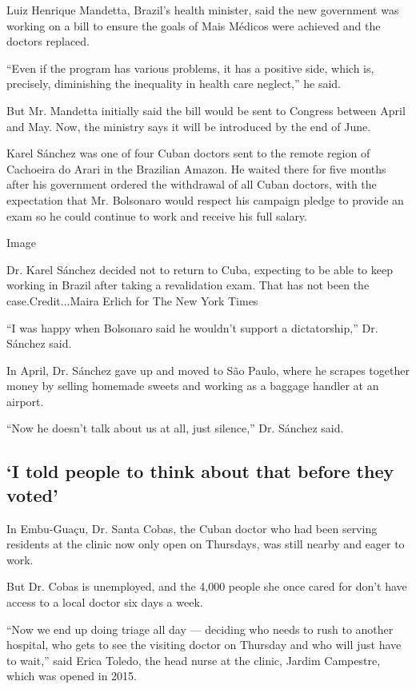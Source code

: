 Luiz Henrique Mandetta, Brazil's health minister, said the new
government was working on a bill to ensure the goals of Mais Médicos
were achieved and the doctors replaced.

``Even if the program has various problems, it has a positive side,
which is, precisely, diminishing the inequality in health care
neglect,'' he said.

But Mr. Mandetta initially said the bill would be sent to Congress
between April and May. Now, the ministry says it will be introduced by
the end of June.

Karel Sánchez was one of four Cuban doctors sent to the remote region of
Cachoeira do Arari in the Brazilian Amazon. He waited there for five
months after his government ordered the withdrawal of all Cuban doctors,
with the expectation that Mr. Bolsonaro would respect his campaign
pledge to provide an exam so he could continue to work and receive his
full salary.

Image

Dr. Karel Sánchez decided not to return to Cuba, expecting to be able to
keep working in Brazil after taking a revalidation exam. That has not
been the case.Credit...Maira Erlich for The New York Times

``I was happy when Bolsonaro said he wouldn't support a dictatorship,''
Dr. Sánchez said.

In April, Dr. Sánchez gave up and moved to São Paulo, where he scrapes
together money by selling homemade sweets and working as a baggage
handler at an airport.

``Now he doesn't talk about us at all, just silence,'' Dr. Sánchez said.

\hypertarget{i-told-people-to-think-about-that-before-they-voted}{%
\subsection{`I told people to think about that before they
voted'}\label{i-told-people-to-think-about-that-before-they-voted}}

In Embu-Guaçu, Dr. Santa Cobas, the Cuban doctor who had been serving
residents at the clinic now only open on Thursdays, was still nearby and
eager to work.

But Dr. Cobas is unemployed, and the 4,000 people she once cared for
don't have access to a local doctor six days a week.

``Now we end up doing triage all day --- deciding who needs to rush to
another hospital, who gets to see the visiting doctor on Thursday and
who will just have to wait,'' said Erica Toledo, the head nurse at the
clinic, Jardim Campestre, which was opened in 2015.

